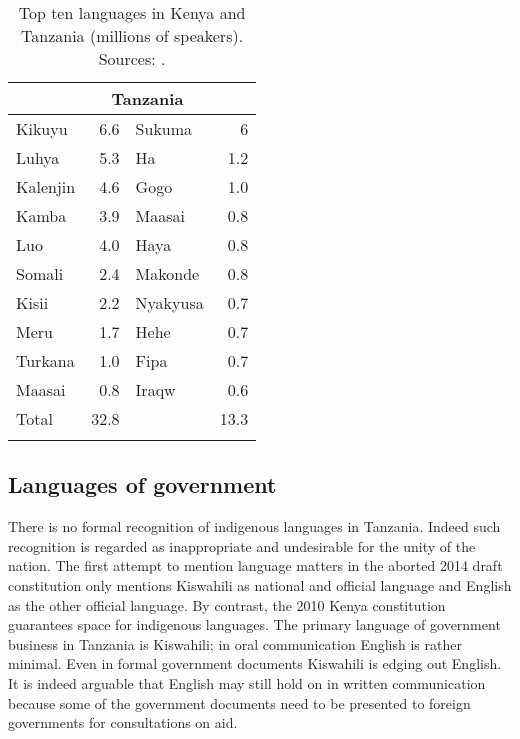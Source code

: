 \documentclass[output=paper,colorlinks,citecolor=brown]{langscibook}
\begin{document}
\begin{table}
    \begin{tabular}{lrlr}
    \lsptoprule
    \multicolumn{2}{c}{Kenya} & \multicolumn{2}{c}{Tanzania}\\
        \midrule
         Kikuyu & 6.6 &  Sukuma & 6\phantom{.0} \\
          Luhya & 5.3 & Ha & 1.2 \\
          Kalenjin & 4.6  & Gogo & 1.0 \\
          Kamba & 3.9 & Maasai & 0.8 \\
          Luo & 4.0 & Haya & 0.8 \\
          Somali & 2.4 & Makonde & 0.8 \\
          Kisii & 2.2 & Nyakyusa & 0.7 \\
          Meru & 1.7 & Hehe & 0.7 \\
          Turkana & 1.0 & Fipa & 0.7 \\
          Maasai & 0.8 & Iraqw & 0.6 \\
        \midrule
    {Total} & {32.8} &  & {13.3} \\
    \lspbottomrule
    \end{tabular}
    \caption{Top ten languages in Kenya and Tanzania (millions of speakers). Sources: \cite{Kenya-National-Bureau-of-Statistics2009, Mradi-wa-Lugha-za-Tanzania2009}.\label{tab:kioko:1}}
\end{table}

\subsection{Languages of government} 
There is no formal recognition of indigenous languages in Tanzania. Indeed such recognition is regarded as inappropriate and undesirable for the unity of the nation. The first attempt to mention language matters in the aborted 2014 draft constitution only mentions Kiswahili as national and official language and English as the other official language. By contrast, the 2010 Kenya constitution guarantees space for indigenous languages. The primary language of government business in Tanzania is Kiswahili; in oral communication English is rather minimal. Even in formal government documents Kiswahili is edging out English. It is indeed arguable that English may still hold on in written communication because some of the government documents need to be presented to foreign governments for consultations on aid.  
\end{document}
